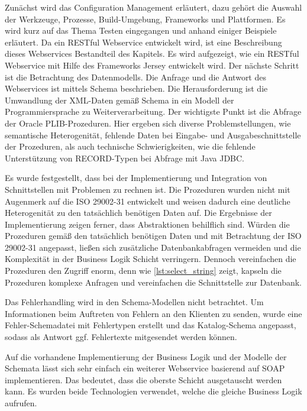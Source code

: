 Zunächst wird das Configuration Management erläutert, dazu gehört die Auswahl der Werkzeuge, Prozesse, Build-Umgebung, Frameworks und Plattformen. Es wird kurz auf das Thema Testen eingegangen und anhand einiger Beispiele erläutert. Da ein \gls{REST}ful \gls{Webservice} entwickelt wird, ist eine Beschreibung dieses Webservices Bestandteil des Kapitels. Es wird aufgezeigt, wie ein  \gls{REST}ful \gls{Webservice} mit Hilfe des Frameworks Jersey entwickelt wird. 
Der nächste Schritt ist die Betrachtung des Datenmodells. Die Anfrage und die Antwort des  \glspl{Webservice} ist mittels Schema beschrieben. Die Herausforderung ist die Umwandlung der XML-Daten gemäß Schema in ein Modell der Programmiersprache zu Weiterverarbeitung.  
Der wichtigste Punkt ist die Abfrage der \gls{Oracle} \gls{PLIB}-Prozeduren. Hier ergeben sich diverse Problemstellungen, wie semantische Heterogenität, fehlende Daten bei Eingabe- und Ausgabeschnittstelle der Prozeduren, als auch technische Schwierigkeiten, wie die fehlende Unterstützung von RECORD-Typen bei Abfrage mit Java JDBC.

Es wurde festgestellt, dass bei der Implementierung und Integration von Schnittstellen mit Problemen zu rechnen ist. Die Prozeduren wurden nicht mit Augenmerk auf die ISO 29002-31 entwickelt und weisen dadurch eine deutliche Heterogenität zu den tatsächlich benötigen Daten auf. Die Ergebnisse der Implementierung zeigen ferner, dass Abstraktionen behilflich sind. Würden die Prozeduren gemäß den tatsächlich benötigen Daten und mit Betrachtung der ISO 29002-31 angepasst, ließen sich zusätzliche Datenbankabfragen vermeiden und die Komplexität in der Business Logik Schicht verringern. Dennoch vereinfachen die Prozeduren den Zugriff enorm, denn wie \autoref{lst:select_string} zeigt, kapseln die Prozeduren komplexe Anfragen und vereinfachen die Schnittstelle zur Datenbank. 
 
Das Fehlerhandling wird in den Schema-Modellen nicht betrachtet. Um Informationen beim Auftreten von Fehlern an den Klienten zu senden, wurde eine Fehler-Schemadatei mit Fehlertypen erstellt und das Katalog-Schema angepasst, sodass als Antwort ggf. Fehlertexte mitgesendet werden können. 

Auf die vorhandene Implementierung der Business Logik und der Modelle der Schemata lässt sich sehr einfach ein weiterer \gls{Webservice} basierend auf SOAP implementieren. Das bedeutet, dass die oberste Schicht ausgetauscht werden kann. Es wurden beide Technologien verwendet, welche die gleiche Business Logik aufrufen. 

